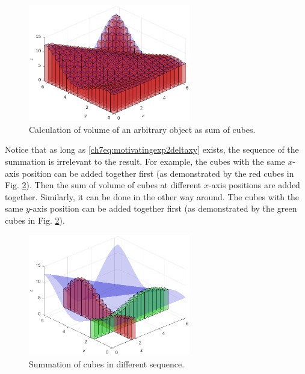 \begin{figure}
	\centering
	\includegraphics[width=200pt]{chapters/part-2/figures/motivatingexp2p2.eps}
	\caption{Calculation of volume of an arbitrary object as sum of cubes.} \label{ch7fig:motivatingexp2p2}
\end{figure}

Notice that as long as \eqref{ch7eq:motivatingexp2deltaxy} exists, the sequence of the summation is irrelevant to the result. For example, the cubes with the same $x$-axis position can be added together first (as demonstrated by the red cubes in Fig. \ref{ch7fig:motivatingexp2p3}). Then the sum of volume of cubes at different $x$-axis positions are added together. Similarly, it can be done in the other way around. The cubes with the same $y$-axis position can be added together first (as demonstrated by the green cubes in Fig. \ref{ch7fig:motivatingexp2p3}).

\begin{figure}
	\centering
	\includegraphics[width=200pt]{chapters/part-2/figures/motivatingexp2p3.eps}
	\caption{Summation of cubes in different sequence.} \label{ch7fig:motivatingexp2p3}
\end{figure}


